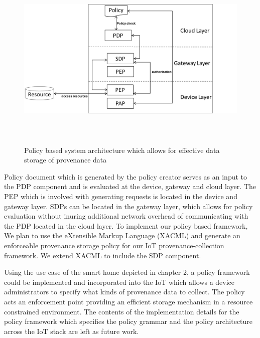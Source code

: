 \begin{figure}[h!]
\begin{center}
\includegraphics[height=3.5in]{policy_architecture.png}
\caption{Policy based system architecture which allows for effective data storage of provenance data}
\label{policy_architecture}
\end{center}
\end{figure}


Policy document which is generated by the policy creator serves as an input to the PDP component and is evaluated at the device, gateway and cloud layer. The PEP which is involved with generating requests is located in the device and gateway layer. SDPs can be located in the gateway layer, which allows for policy evaluation without inuring additional network overhead of communicating with the PDP located in the cloud layer. To implement our policy based framework, We plan to use the eXtensible Markup Language (XACML)  \cite{xacml} and generate an enforceable provenance storage policy for our IoT provenance-collection framework. We extend XACML to include the SDP component.



\par Using the use case of the smart home depicted in chapter 2, a policy framework could be implemented and incorporated into the IoT which allows a device administrators to specify what kinds of provenance data to collect. The policy acts an enforcement point providing an efficient storage mechanism in a resource constrained environment. The contents of the implementation details for the policy framework which specifies the policy grammar and the policy architecture across the IoT stack are left as future work.


